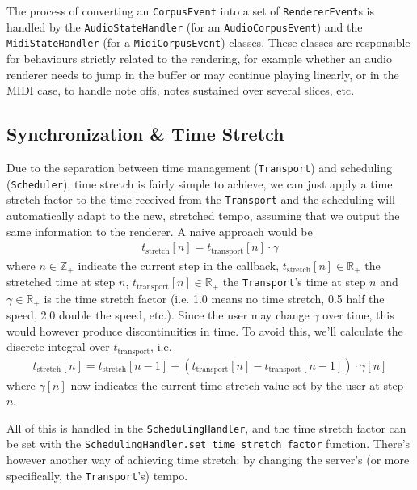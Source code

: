 The process of converting an \texttt{CorpusEvent} into a set of \texttt{RendererEvent}s is handled by the \texttt{AudioStateHandler} (for an \texttt{AudioCorpusEvent}) and the \texttt{MidiStateHandler} (for a \texttt{MidiCorpusEvent}) classes. These classes are responsible for behaviours strictly related to the rendering, for example whether an audio renderer needs to jump in the buffer or may continue playing linearly, or in the MIDI case, to handle note offs, notes sustained over several slices, etc.




\subsection{Synchronization \& Time Stretch}\label{ssec:2-time-stretch}

Due to the separation between time management (\texttt{Transport}) and scheduling \\ (\texttt{Scheduler}), time stretch is fairly simple to achieve, we can just apply a time stretch factor to the time received from the \texttt{Transport} and the scheduling will automatically adapt to the new, stretched tempo, assuming that we output the same information to the renderer. A naive approach would be
\begin{align}
	t_\text{stretch}[n] = t_\text{transport}[n] \cdot \gamma
\end{align}
where $n \in \mathbb Z_+$ indicate the current step in the callback, $t_\text{stretch}[n] \in \mathbb R_+$ the stretched time at step $n$, $t_\text{transport}[n] \in \mathbb R_+$ the \texttt{Transport}'s time at step $n$ and $\gamma \in \mathbb R_+$ is the time stretch factor (i.e. 1.0 means no time stretch, 0.5 half the speed, 2.0 double the speed, etc.). Since the user may change $\gamma$ over time, this would however produce discontinuities in time. To avoid this, we'll calculate the discrete integral over $t_\text{transport}$, i.e.
\begin{align}\label{eq:2-timestretch}
	t_\text{stretch}[n] = 	t_\text{stretch}[n-1]  + \left(t_\text{transport}[n] - t_\text{transport}[n-1]\right)\cdot \gamma[n]
\end{align}
where $\gamma[n]$ now indicates the current time stretch value set by the user at step $n$. 

All of this is handled in the \texttt{SchedulingHandler}, and the time stretch factor can be set with the \texttt{SchedulingHandler.set\_time\_stretch\_factor} function. There's however another way of achieving time stretch: by changing the server's (or more specifically, the \texttt{Transport}'s) tempo.

